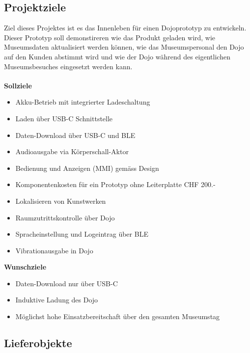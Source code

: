 \documentclass[10pt,a4paper,oneside]{99_fhnwreport}
\begin{document}
\subsection{Projektziele}
Ziel dieses Projektes ist es das Innenleben für einen Dojoprototyp zu entwickeln. Dieser Prototyp soll demonstireren wie das Produkt geladen wird, wie Museumsdaten aktualisiert werden können, wie das Museumspersonal den Dojo auf den Kunden abstimmt wird und wie der Dojo während des eigentlichen Museumsbesuches eingesetzt werden kann.\\
\\
\textbf{Sollziele}
\begin{itemize}
\item{Akku-Betrieb mit integrierter Ladeschaltung}
\item{Laden über USB-C Schnittstelle}
\item{Daten-Download über USB-C und BLE}
\item{Audioausgabe via Körperschall-Aktor}
\item{Bedienung und Anzeigen (MMI) gemäss Design}
\item{Komponentenkosten für ein Prototyp ohne Leiterplatte CHF 200.- }
\item{Lokalisieren von Kunstwerken}
\item{Raumzutrittskontrolle über Dojo}
\item{Spracheinstellung und Logeintrag über BLE}
\item{Vibrationausgabe in Dojo}
\end{itemize}

\textbf{Wunschziele}
\begin{itemize}
\item{Daten-Download nur über USB-C}
\item{Induktive Ladung des Dojo}
\item{Möglichst hohe Einsatzbereitschaft über den gesamten Museumstag}
\end{itemize}

\subsection{Lieferobjekte}
\end{document}
